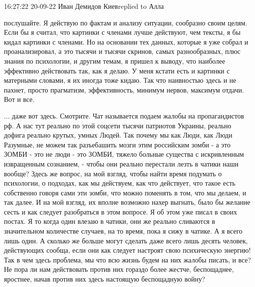 16:27:22 20-09-22
Иван Демидов Киевreplied to Алла

послушайте. Я действую по фактам и анализу ситуации, сообразно своим целям.
Если бы я считал, что картинки с членами лучше действуют, чем тексты, я бы
кидал картинки с членами. Но на основании тех данных, которые я уже собрал и
проанализировал, а это тысячи и тысячи скринов, самых разнообразных, плюс
знания по психологии, и другим темам, я пришел к выводу, что наиболее
эффективно действовать так, как я делаю. У меня кстати есть и картинки с
матерными словами, я их иногда тоже кидаю. Так что наивностью здесь и не
пахнет, просто прагматизм, эффективность, минимум нервов, максимум отдачи. Вот
и все.

... даже вот здесь. Смотрите. Чат называется подаем жалобы на пропагандистов
рф. А нас тут реально по этой соцсети тысячи патриотов Украины, реально дофига
реально крутых, умных Людей. Так почему мы как Люди, как Люди Разумные, не
можем так разъебашить мозги этим российским зомби - а это ЗОМБИ - это не люди -
это ЗОМБИ, тяжело больные существа с искривленным извращенным сознанием, -
чтобы они реально перестали лезть в чатики наши вообще? Здесь же вопрос, на мой
взгляд, чтобы найти время подумать о психологии, о подходах, как мы действуем,
как что действует, что такое есть собственно говоря сами эти зомби, что можно
поменять в том, что мы делаем, и так далее. И на мой взгляд, их вполне возможно
нахер выгнать, было бы желание сесть и как следует разобраться в этом вопросе.
Я об этом уже писал в своих постах. Я то когда один влезаю в чатики, они же
реально сливаются в значительном количестве случаев, на то время, пока я сижу в
чатике. А я всего лишь один. А сколько же больше могут сделать даже всего лишь
десять человек, действующих сообща, если они как следует настроят свою
психическую энергию! Так в чем здесь проблема, мы что всю жизнь будем на них
жалобы писать, и все? Не пора ли нам действовать против них гораздо более
жестче, беспощаднее, яростнее, начав против них здесь настоящую беспощадную
войну?






